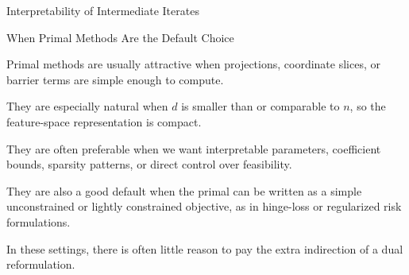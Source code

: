 \documentclass[11pt,compress,t,notes=noshow, xcolor=table]{beamer}
\begin{document}
\begin{framev}[fs=small]{Interpretability of Intermediate Iterates}
\end{framev}


\begin{framei}[fs=small]{When Primal Methods Are the Default Choice}
\item Primal methods are usually attractive when projections, coordinate slices, or barrier terms are simple enough to compute.
\item They are especially natural when $d$ is smaller than or comparable to $n$, so the feature-space representation is compact.
\item They are often preferable when we want interpretable parameters, coefficient bounds, sparsity patterns, or direct control over feasibility.
\item They are also a good default when the primal can be written as a simple unconstrained or lightly constrained objective, as in hinge-loss or regularized risk formulations.
\item In these settings, there is often little reason to pay the extra indirection of a dual reformulation.
\end{framei}
\end{document}

